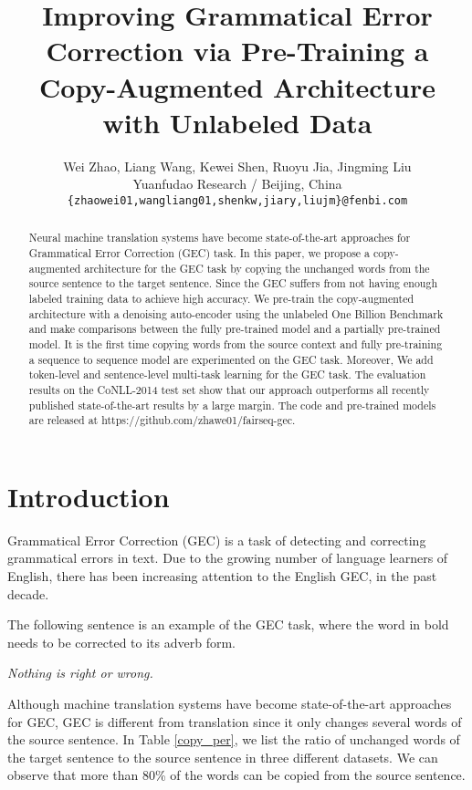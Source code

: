\documentclass[11pt,a4paper]{article}
\title{Improving Grammatical Error Correction via Pre-Training a Copy-Augmented Architecture with Unlabeled Data}
\author{Wei Zhao, Liang Wang, Kewei Shen, Ruoyu Jia, Jingming Liu \\
  Yuanfudao Research / Beijing, China \\
  {\tt \{zhaowei01,wangliang01,shenkw,jiary,liujm\}@fenbi.com}}
\date{}
\begin{document}
\maketitle
\begin{abstract}
Neural machine translation systems have become state-of-the-art approaches for Grammatical Error Correction (GEC) task. In this paper, we propose a copy-augmented architecture for the GEC task by copying the unchanged words from the source sentence to the target sentence. Since the GEC suffers from not having enough labeled training data to achieve high accuracy. We pre-train the copy-augmented architecture with a denoising auto-encoder using the unlabeled One Billion Benchmark and make comparisons between the fully pre-trained model and a partially pre-trained model. It is the first time copying words from the source context and fully pre-training a sequence to sequence model are experimented on the GEC task. Moreover, We add token-level and sentence-level multi-task learning for the GEC task. The evaluation results on the CoNLL-2014 test set show that our approach outperforms all recently published state-of-the-art results by a large margin. The code and pre-trained models are released at https://github.com/zhawe01/fairseq-gec.
\end{abstract}


\section{Introduction}

Grammatical Error Correction (GEC) is a task of detecting and correcting grammatical errors in text. Due to the growing number of language learners of English, there has been increasing attention to the English GEC, in the past decade.

The following sentence is an example of the GEC task, where the word in bold needs to be corrected to its adverb form.

\begin{center}
\textit{Nothing is  right or wrong.}
\end{center}

Although machine translation systems have become state-of-the-art approaches for GEC, GEC is different from translation since it only changes several words of the source sentence. In Table \ref{copy_per}, we list the ratio of unchanged words of the target sentence to the source sentence in three different datasets. We can observe that more than 80\% of the words can be copied from the source sentence.
\end{document}
